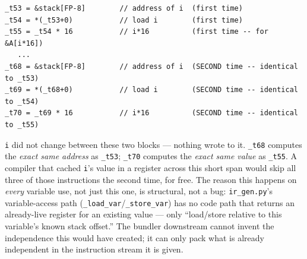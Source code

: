 \documentclass[11pt,a4paper]{article}
\begin{document}
\begin{lstlisting}[caption={\texttt{matmul\_n16.c}'s inner loop IR (re-generated fresh) --- \texttt{i} is loaded and multiplied by 16 \emph{twice}}]
_t53 = &stack[FP-8]        // address of i  (first time)
_t54 = *(_t53+0)           // load i        (first time)
_t55 = _t54 * 16           // i*16          (first time -- for &A[i*16])
   ...
_t68 = &stack[FP-8]        // address of i  (SECOND time -- identical to _t53)
_t69 = *(_t68+0)           // load i        (SECOND time -- identical to _t54)
_t70 = _t69 * 16           // i*16          (SECOND time -- identical to _t55)
\end{lstlisting}

\texttt{i} did not change between these two blocks --- nothing wrote to it. \texttt{\_t68}
computes the \emph{exact same address} as \texttt{\_t53}; \texttt{\_t70} computes the
\emph{exact same value} as \texttt{\_t55}. A compiler that cached \texttt{i}'s value in a
register across this short span would skip all three of those instructions the second
time, for free. The reason this happens on \emph{every} variable use, not just this one,
is structural, not a bug: \texttt{ir\_gen.py}'s variable-access path
(\texttt{\_load\_var}/\texttt{\_store\_var}) has no code path that returns an
already-live register for an existing value --- only ``load/store relative to this
variable's known stack offset.'' The bundler downstream cannot invent the independence
this would have created; it can only pack what is already independent in the instruction
stream it is given.
\end{document}
